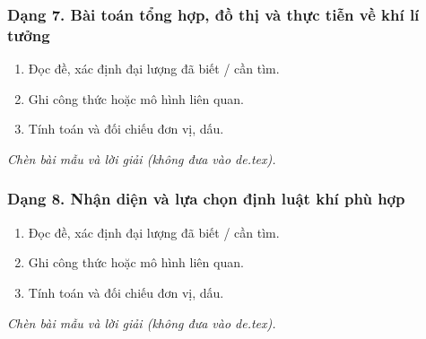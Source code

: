 \subsubsection{Dạng 7. Bài toán tổng hợp, đồ thị và thực tiễn về khí lí tưởng}
\begin{phuongphap}
\begin{enumerate}
\item Đọc đề, xác định đại lượng đã biết / cần tìm.
\item Ghi công thức hoặc mô hình liên quan.
\item Tính toán và đối chiếu đơn vị, dấu.
\end{enumerate}
\end{phuongphap}
\begin{vidumau}
\textit{Chèn bài mẫu và lời giải (không đưa vào de.tex).}
\end{vidumau}

\subsubsection{Dạng 8. Nhận diện và lựa chọn định luật khí phù hợp}
\begin{phuongphap}
\begin{enumerate}
\item Đọc đề, xác định đại lượng đã biết / cần tìm.
\item Ghi công thức hoặc mô hình liên quan.
\item Tính toán và đối chiếu đơn vị, dấu.
\end{enumerate}
\end{phuongphap}
\begin{vidumau}
\textit{Chèn bài mẫu và lời giải (không đưa vào de.tex).}
\end{vidumau}

